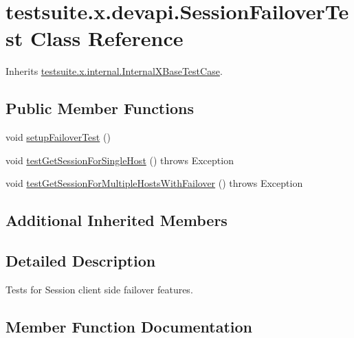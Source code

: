 \hypertarget{classtestsuite_1_1x_1_1devapi_1_1_session_failover_test}{}\section{testsuite.\+x.\+devapi.\+Session\+Failover\+Test Class Reference}
\label{classtestsuite_1_1x_1_1devapi_1_1_session_failover_test}


Inherits \mbox{\hyperlink{classtestsuite_1_1x_1_1internal_1_1_internal_x_base_test_case}{testsuite.\+x.\+internal.\+Internal\+X\+Base\+Test\+Case}}.

\subsection*{Public Member Functions}
\begin{DoxyCompactItemize}
\item 
void \mbox{\hyperlink{classtestsuite_1_1x_1_1devapi_1_1_session_failover_test_a1b109bdde6c1adf990abcb54facd0784}{setup\+Failover\+Test}} ()
\item 
void \mbox{\hyperlink{classtestsuite_1_1x_1_1devapi_1_1_session_failover_test_a7bada9d526863798fc56ec329319b703}{test\+Get\+Session\+For\+Single\+Host}} ()  throws Exception 
\item 
void \mbox{\hyperlink{classtestsuite_1_1x_1_1devapi_1_1_session_failover_test_aa33c73b0634b7c45783b503670a34556}{test\+Get\+Session\+For\+Multiple\+Hosts\+With\+Failover}} ()  throws Exception 
\end{DoxyCompactItemize}
\subsection*{Additional Inherited Members}


\subsection{Detailed Description}
Tests for Session client side failover features. 

\subsection{Member Function Documentation}
\mbox{\label{classtestsuite_1_1x_1_1devapi_1_1_session_failover_test_a1b109bdde6c1adf990abcb54facd0784}} 
